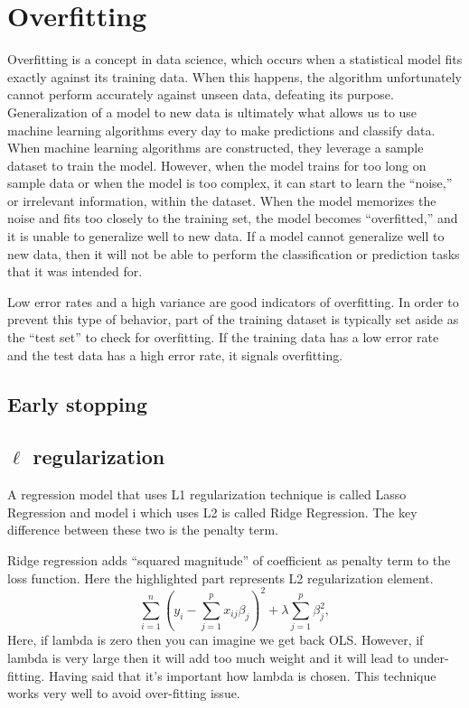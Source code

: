 \section{Overfitting}
Overfitting is a concept in data science, which occurs when a statistical model fits exactly
against its training data. 
When this happens, the algorithm unfortunately cannot perform accurately against unseen data,
defeating its purpose.
Generalization of a model to new data is ultimately what allows us to use machine learning
algorithms every day to make predictions and classify data.
When machine learning algorithms are constructed, they leverage a sample dataset 
to train the model. 
However, when the model trains for too long on sample data or when the model is too complex, 
it can start to learn the “noise,” or irrelevant information, within the dataset. 
When the model memorizes the noise and fits too closely to the training set, 
the model becomes “overfitted,” and it is unable to generalize well to new data.
If a model cannot generalize well to new data, then it will not be able to perform the
classification or prediction tasks that it was intended for.

Low error rates and a high variance are good indicators of overfitting.
In order to prevent this type of behavior, part of the training dataset is typically set aside 
as the “test set” to check for overfitting. 
If the training data has a low error rate and the test data has a high error rate, 
it signals overfitting.

\subsection{Early stopping}
\subsection{$\ell$ regularization}
A regression model that uses L1 regularization technique is called Lasso Regression and model i
which uses L2 is called Ridge Regression.
The key difference between these two is the penalty term.

Ridge regression adds ``squared magnitude'' of coefficient as penalty term to the loss function.
Here the highlighted part represents L2 regularization element.
\begin{equation}
	\label{equ:ridge_regression}
	\sum_{i=1}^{n}(y_{i}-\sum_{j=1}^{p}x_{ij}\beta_{j})^{2} + \lambda \sum_{j=1}^{p}\beta_{j}^{2},
\end{equation}
Here, if lambda is zero then you can imagine we get back OLS.
However, if lambda is very large then it will add too much weight and it will lead to
under-fitting. Having said that it’s important how lambda is chosen.
This technique works very well to avoid over-fitting issue.


